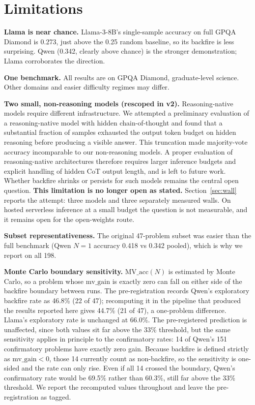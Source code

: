 \documentclass{article}
\begin{document}
\section{Limitations}

\textbf{Llama is near chance.} Llama-3-8B's single-sample accuracy on full
GPQA Diamond is 0.273, just above the 0.25 random baseline, so its backfire
is less surprising. Qwen (0.342, clearly above chance) is the stronger
demonstration; Llama corroborates the direction.

\textbf{One benchmark.} All results are on GPQA Diamond, graduate-level
science. Other domains and easier difficulty regimes may differ.

\textbf{Two small, non-reasoning models (rescoped in v2).} Reasoning-native models require
different infrastructure. We attempted a preliminary evaluation of a
reasoning-native model with hidden chain-of-thought and found that a
substantial fraction of samples exhausted the output token budget on hidden
reasoning before producing a visible answer. This truncation made
majority-vote accuracy incomparable to our non-reasoning models. A proper
evaluation of reasoning-native architectures therefore requires larger
inference budgets and explicit handling of hidden CoT output length, and is
left to future work. Whether backfire shrinks or persists for such models
remains the central open question. \textbf{This limitation is no longer open as
stated.} Section~\ref{sec:wall} reports the attempt: three models and three
separately measured walls. On hosted serverless inference at a small budget the
question is not measurable, and it remains open for the open-weights route.

\textbf{Subset representativeness.} The original 47-problem subset was easier
than the full benchmark (Qwen $N=1$ accuracy 0.418 vs 0.342 pooled), which is
why we report on all 198.

\textbf{Monte Carlo boundary sensitivity.} $\text{MV\_acc}(N)$ is estimated by
Monte Carlo, so a problem whose $\text{mv\_gain}$ is exactly zero can fall on
either side of the backfire boundary between runs. The pre-registration records
Qwen's exploratory backfire rate as 46.8\% (22 of 47); recomputing it in the
pipeline that produced the results reported here gives 44.7\% (21 of 47), a
one-problem difference. Llama's exploratory rate is unchanged at 66.0\%. The
pre-registered prediction is unaffected, since both values sit far above the
33\% threshold, but the same sensitivity applies in principle to the
confirmatory rates: 14 of Qwen's 151 confirmatory problems have exactly zero
gain. Because backfire is defined strictly as $\text{mv\_gain} < 0$, those 14
currently count as non-backfire, so the sensitivity is one-sided and the rate
can only rise. Even if all 14 crossed the boundary, Qwen's confirmatory rate
would be 69.5\% rather than 60.3\%, still far above the 33\% threshold. We
report the recomputed values throughout and leave the pre-registration as
tagged.
\end{document}
